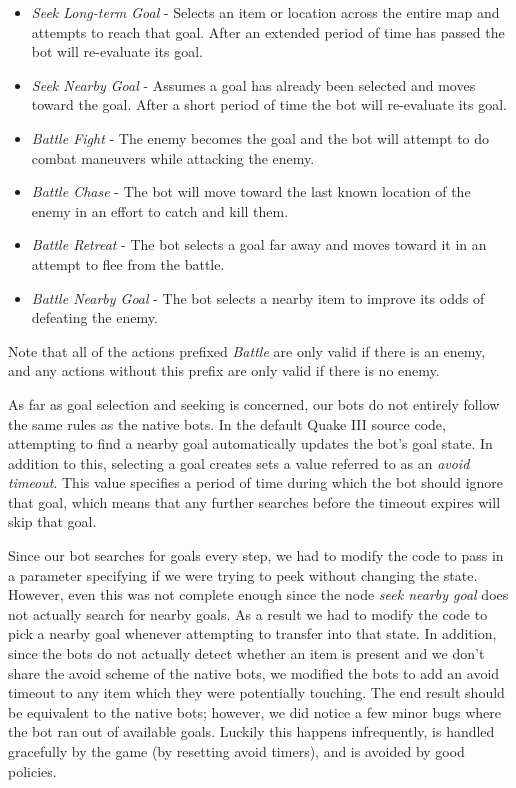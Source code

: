 {\fontsize{12}{5}\selectfont
\begin{itemize}
    \item \emph{Seek Long-term Goal} - Selects an item or location across the entire map and attempts to reach that goal. After an extended period of time has passed the bot will re-evaluate its goal.
    \item \emph{Seek Nearby Goal} - Assumes a goal has already been selected and moves toward the goal. After a short period of time the bot will re-evaluate its goal.
    \item \emph{Battle Fight} - The enemy becomes the goal and the bot will attempt to do combat maneuvers while attacking the enemy.
    \item \emph{Battle Chase} - The bot will move toward the last known location of the enemy in an effort to catch and kill them.
    \item \emph{Battle Retreat} - The bot selects a goal far away and moves toward it in an attempt to flee from the battle.
    \item \emph{Battle Nearby Goal} - The bot selects a nearby item to improve its odds of defeating the enemy.
\end{itemize} }
Note that all of the actions prefixed \emph{Battle} are only valid if there is an enemy, and any actions without this prefix are only valid if there is no enemy.

As far as goal selection and seeking is concerned, our bots do not entirely follow the same rules as the native bots. In the default Quake III source code, attempting to find a nearby goal automatically updates the bot's goal state. In addition to this, selecting a goal creates sets a value referred to as an \emph{avoid timeout}. This value specifies a period of time during which the bot should ignore that goal, which means that any further searches before the timeout expires will skip that goal. 

Since our bot searches for goals every step, we had to modify the code to pass in a parameter specifying if we were trying to peek without changing the state. However, even this was not complete enough since the node \emph{seek nearby goal} does not actually search for nearby goals. As a result we had to modify the code to pick a nearby goal whenever attempting to transfer into that state. In addition, since the bots do not actually detect whether an item is present and we don't share the avoid scheme of the native bots, we modified the bots to add an avoid timeout to any item which they were potentially touching. The end result should be equivalent to the native bots; however, we did notice a few minor bugs where the bot ran out of available goals. Luckily this happens infrequently, is handled gracefully by the game (by resetting avoid timers), and is avoided by good policies.

